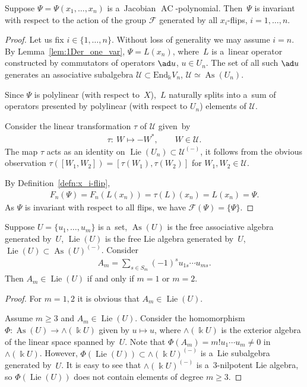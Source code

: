 \begin{lemma}
\label{lem:JacobianInvariant}
Suppose $\Psi=\Psi(x_1,\dots, x_n)$ is a~Jacobian $\operatorname{AC}$-polynomial.
Then~$\Psi $ is invariant with respect to the action of the group $\mathcal F$ generated by all $x_i$-flips, $i=1,\dots,
n$.
\end{lemma}

\begin{proof}
Let us f\/ix $i\in \{1,\dots, n\}$.
Without loss of generality we may assume $i=n$.
By Lemma~\ref{lem:1Der_one_var}, $\Psi = L(x_n)$, where~$L$ is a~linear operator constructed by commutators of operators
$\ad u$, $u\in U_n$.
The set of all such $\ad u$ generates an associative subalgebra $\mathcal U\subset \mathrm{End}_\Bbbk V_n$,
$\mathcal U\simeq \operatorname{As}(U_n)$.

Since $\Psi $ is polylinear (with respect to~$X$),~$L$ naturally splits into a~sum of operators presented by polylinear
(with respect to $U_n$) elements of $\mathcal U$.

Consider the linear transformation $\tau $ of $\mathcal U$ given~by
\begin{gather*}
\tau: \ W \mapsto -W^*,
\qquad
W\in \mathcal U.
\end{gather*}
The map $\tau $ acts as an identity on $\operatorname{Lie}(U_n)\subset \mathcal U^{(-)}$, it follows from the obvious observation $\tau
([W_1,W_2])=[\tau(W_1),\tau(W_2)]$ for $W_1,W_2\in \mathcal U$.

By Def\/inition~\ref{defn:x_i-flip},
\begin{gather*}
F_n(\Psi) = F_n(L(x_n)) = \tau(L)(x_n) = L(x_n) = \Psi.
\end{gather*}
As $\Psi $ is invariant with respect to all f\/lips, we have $\mathcal F(\Psi) =\{\Psi \}$.
\end{proof}

\begin{lemma}
\label{lem:AlternatingSum=Lie}
Suppose $U=\{u_1,\dots, u_m\}$ is a~set, $\operatorname{As}(U) $ is the free associative algebra generated by~$U$, $\operatorname{Lie}(U)$ is the free
Lie algebra generated by~$U$, $\operatorname{Lie}(U)\subset \operatorname{As}(U)^{(-)}$.
Consider
\begin{gather*}
A_m = \sum\limits_{s\in S_m}(-1)^s u_{1s}\cdots u_{ms}.
\end{gather*}
Then $A_m \in \operatorname{Lie}(U)$ if and only if $m=1$ or $m=2$.
\end{lemma}

\begin{proof}
For $m=1,2$ it is obvious that $A_m\in \operatorname{Lie}(U)$.

Assume $m\ge 3$ and $A_m\in \operatorname{Lie}(U)$.
Consider the homomorphism $\Phi: \operatorname{As}(U)\to \wedge (\Bbbk U)$ given by $u\mapsto u$, where $\wedge (\Bbbk U)$ is the
exterior algebra of the linear space spanned by~$U$.
Note that $\Phi(A_m) = m! u_1\cdots u_m \ne 0$ in $\wedge(\Bbbk U)$.
However, $\Phi(\operatorname{Lie}(U))\subset \wedge(\Bbbk U)^{(-)}$ is a~Lie subalgebra generated by~$U$.
It is easy to see that $\wedge(\Bbbk U)^{(-)}$ is a~3-nilpotent Lie algebra, so $\Phi(\operatorname{Lie}(U))$ does not contain elements
of degree $m\ge 3$.
\end{proof}

